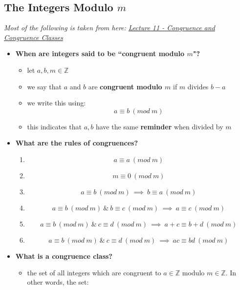 \documentclass{exam}
\begin{document}
\subsection{The Integers Modulo $m$}

\textit{Most of the following is taken from here: \href{https://math.okstate.edu/people/binegar/3613/3613-l11.pdf}{Lecture 11 - Congruence and Congruence Classes}}

\begin{itemize}
    \item \textbf{When are integers said to be ``congruent modulo $m$"?}
    \begin{itemize}
        \item let $a,b,m \in \mathbb{Z}$
        \item we say that $a$ and $b$ are \textbf{congruent modulo $m$} if $m$ divides $b - a$
        \item we write this using:
        \[
        a \equiv b \ (mod \ m)
        \]
        \item this indicates that $a,b$ have the same \textbf{reminder} when divided by $m$
    \end{itemize}
    \item \textbf{What are the rules of congruences?}
    \begin{enumerate}
        \item 
        \[
        a \equiv a \ (mod \ m)
        \]
        \item 
        \[
        m \equiv 0 \ (mod \ m)
        \]
        \item 
        \[
        a \equiv b \ (mod \ m) \ \implies \ b \equiv a \ (mod \ m)
        \]
        \item 
        \[
        a \equiv b \ (mod \ m) \ \& \ b \equiv c \ (mod \ m) \ \implies \ a \equiv c \ (mod \ m)
        \]
        \item
        \[
        a \equiv b \ (mod \ m) \ \& \ c \equiv d \ (mod \ m) \ \implies \ a + c \equiv b + d \ (mod \ m)
        \]
        \item
        \[
        a \equiv b \ (mod \ m) \ \& \ c \equiv d \ (mod \ m) \ \implies \ ac \equiv bd \ (mod \ m)
        \]
    \end{enumerate}
    \item \textbf{What is a congruence class?}
    \begin{itemize}
        \item the set of all integers which are congruent to $a \in \mathbb{Z}$ modulo $m \in \mathbb{Z}$. In other words, the set:

\end{itemize}
\end{itemize}
\end{document}
